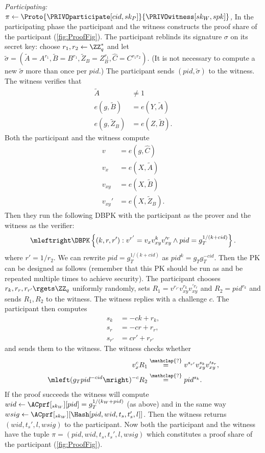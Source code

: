 \emph{Participating: \(\pi\gets
    \Proto{\PRIVOparticipate[cid, sk_P]}{\PRIVOwitness[sk_W, spk]}\),}
In the participating phase the participant and the witness constructs the proof 
share of the participant (\cref{fig:ProofFig}).
The participant reblinds its signature \(\sigma\) on its secret key: choose 
\(r_1, r_2\gets \ZZ_q^*\) and let \(
  \tilde\sigma = (\tilde A = A^{r_1},
                  \tilde B = B^{r_1},
                  \tilde Z_B = Z_B^{r_1},
                  \hat C = C^{r_1 r_2}).
\) (It is not necessary to compute a new \(\tilde\sigma\) more than once per 
\(pid\).)
The participant sends \((pid, \tilde\sigma)\) to the witness.
The witness verifies that
\begin{align*}
  \tilde A          &\neq 1 \\
  e(g, \tilde B)    &= e(Y, \tilde A) \\
  e(g, \tilde Z_B)  &= e(Z, \tilde B).
\end{align*}
Both the participant and the witness compute
\begin{align*}
  v &= e(g, \hat C) \\
  v_x &= e(X, \tilde A) \\
  v_{xy} &= e(X, \tilde B) \\
  v_{xy}' &= e(X, \tilde Z_B).
\end{align*}
Then they run the following \ac{DBPK} with the participant as the prover and the 
witness as the verifier:
\begin{multline*}
  \mleftright
  \DBPK\left\{(k, r, r') : v^{r'} = v_x v_{xy}^k v_{xy}^{\prime r} \land
    pid = g_T^{1/(k+cid)} \right\}.
\end{multline*}
where \(r' = 1/r_2\).
We can rewrite \(pid = g_T^{1/(k+cid)}\) as \(pid^k = g_T g_T^{-cid}\).
Then the \ac{PK} can be designed as follows (remember that this \ac{PK} should 
be run as  and be repeated multiple times to achieve security).
The participant chooses \(r_k, r_r, r_{r'}\rgets \ZZ_q\) uniformly randomly, 
sets \(R_1 = v^{r_{r'}} v_{xy}^{r_k} v_{xy}^{\prime r_r}\) and \(R_2 = 
  pid^{r_k}\) and sends \(R_1, R_2\) to the witness.
The witness replies with a challenge \(c\).
The participant then computes
\begin{align*}
s_k &= -ck + r_k, \\
s_r &= -cr + r_r, \\
s_{r'} &= cr' + r_{r'}
\end{align*}
and sends them to the witness.
The witness checks whether
\begin{align*}
  v_x^c R_1 &\overset{\mathclap{?}}{=} v^{s_{r'}} v_{xy}^{s_k} v_{xy}^{\prime 
    s_r}, \\
  \mleft(g_T pid^{-cid}\mright)^{-c} R_2 &\overset{\mathclap{?}}{=} pid^{s_k}.
\end{align*}
If the proof succeeds the witness will compute \(wid\gets \ACprf[_{sk_W}][pid] = 
  g_T^{1/(k_W+pid)}\) (as above) and in the same way \(wsig\gets 
  \ACprf[_{sk_W}][\Hash[pid, wid, t_s, t_s', l]]\).
Then the witness returns \((wid, t_s', l, wsig)\) to the participant.
Now both the participant and the witness have the tuple \(\pi = (pid, wid, t_s, 
  t_s', l, wsig)\) which constitutes a proof share of the participant 
(\cref{fig:ProofFig}).

